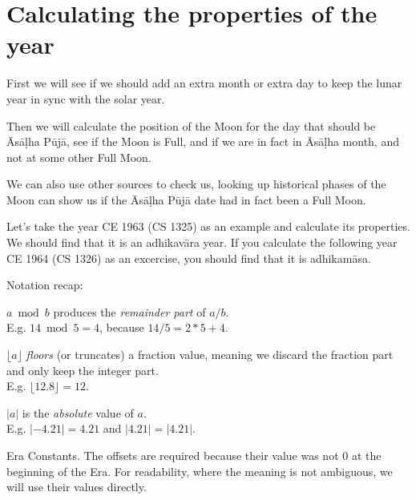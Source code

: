 \documentclass[11pt,oneside]{memoir-article}
\begin{document}
\section{Calculating the properties of the year}
\label{sec-4-2}

First we will see if we should add an extra month or extra day to keep the
lunar year in sync with the solar year.

Then we will calculate the position of the Moon for the day that should be
Āsāḷha Pūjā, see if the Moon is Full, and if we are in fact in Āsāḷha month, and
not at some other Full Moon.

We can also use other sources to check us, looking up historical phases of the
Moon can show us if the Āsāḷha Pūjā date had in fact been a Full Moon.

Let's take the year CE 1963 (CS 1325) as an example and calculate its
properties. We should find that it is an adhikavāra year. If you calculate the
following year CE 1964 (CS 1326) as an excercise, you should find that it is
adhikamāsa.

Notation recap:

$a \bmod b$ produces the \emph{remainder part} of $a/b$.\\
E.g. $14 \bmod 5 = 4$, because $14/5 = 2*5 + 4$.

$\lfloor a \rfloor$ \emph{floors} (or truncates) a fraction value, meaning we discard
the fraction part and only keep the integer part.\\
E.g. $\lfloor 12.8 \rfloor = 12$.

$|a|$ is the \emph{absolute} value of $a$.\\
E.g. $|-4.21| = 4.21$ and $|4.21| = |4.21|$.


Era Constants. The offsets are required because their value was not 0 at the beginning of the Era.
For readability, where the meaning is not ambiguous, we will use their values directly.
\end{document}
